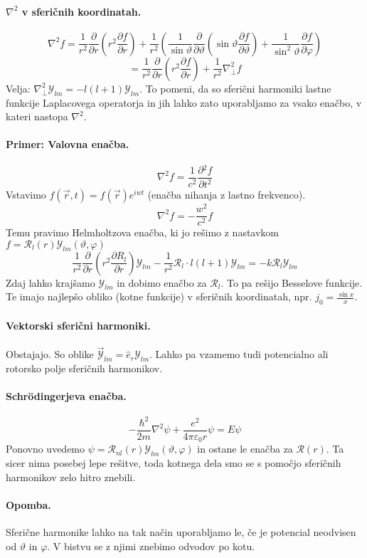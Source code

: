 \documentclass[a4paper]{article}
\newcommand{\vct}[1]{\overrightarrow{#1}}
\newcommand{\pd}[2]{\frac{\partial {#1}}{\partial {#2}}}
\begin{document}
\paragraph{$\nabla^2$ v sferičnih koordinatah.} $$\nabla^2f = \frac{1}{r^2}\pd{}{r}\left(r^2\pd{f}{r}\right) + \frac{1}{r^2}\left(\frac{1}{\sin\vartheta}\pd{}{\vartheta}\left(\sin\vartheta\pd{f}{\vartheta}\right) + \frac{1}{\sin^2\vartheta}\pd{f}{\varphi}\right)$$
$$= \frac{1}{r^2}\pd{}{r}\left(r^2\pd{f}{r}\right) + \frac{1}{r^2}\nabla^2_\perp f$$
Velja: $\displaystyle{\nabla^2_\perp \mathcal{Y}_{lm} = -l(l+1)\mathcal{Y}_{lm}}$. To pomeni, da so sferični harmoniki lastne funkcije Laplacovega operatorja in jih lahko zato uporabljamo za vsako enačbo, v kateri nastopa $\nabla^2$.
\paragraph{Primer: Valovna enačba.}
$$\nabla^2f = \frac{1}{c^2}\pd{^2f}{t^2}$$
Vstavimo $f(\vct{r}, t) = f(\vct{r})e^{iwt}$ (enačba nihanja z lastno frekvenco).
$$\nabla^2f = -\frac{w^2}{c^2}f$$
Temu pravimo Helmholtzova enačba, ki jo rešimo z nastavkom $\displaystyle{f = \mathcal{R}_l(r)\mathcal{Y}_{lm}(\vartheta, \varphi)}$
$$\frac{1}{r^2}\pd{}{r}\left(r^2\pd{R_l}{r}\right) \mathcal{Y}_{lm} - \frac{1}{r^2}\mathcal{R}_l\cdot l(l+1)\mathcal{Y}_{lm} = -k\mathcal{R}_l\mathcal{Y}_{lm}$$
Zdaj lahko krajšamo $\mathcal{Y}_{lm}$ in dobimo enačbo za $\mathcal{R}_l$. To pa rešijo Besselove funkcije. Te imajo najlepšo obliko (kotne funkcije) v sferičnih koordinatah, npr. $\displaystyle{j_0 = \frac{\sin x}{x}}$.
\paragraph{Vektorski sferični harmoniki.} Obstajajo. So oblike $\vct{\mathcal{Y}}_{lm} = \hat{e}_r\mathcal{Y}_{lm}$. Lahko pa vzamemo tudi potencialno ali rotorsko polje sferičnih harmonikov.
\paragraph{Schrödingerjeva enačba.} $$-\frac{\hbar^2}{2m}\nabla^2\psi + \frac{e^2}{4\pi\varepsilon_0 r}\psi = E\psi$$
Ponovno uvedemo $\psi = \mathcal{R}_{nl}(r)\mathcal{Y}_{lm}(\vartheta, \varphi)$ in ostane le enačba za $\mathcal{R}(r)$. Ta sicer nima posebej lepe rešitve, toda kotnega dela smo se s pomočjo sferičnih harmonikov zelo hitro znebili.
\paragraph{Opomba.} Sferične harmonike lahko na tak način uporabljamo le, če je potencial neodvisen od $\vartheta$ in $\varphi$. V bistvu se z njimi znebimo odvodov po kotu.
\end{document}
